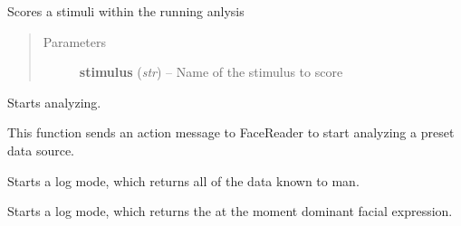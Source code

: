\documentclass[letterpaper,10pt,english]{sphinxmanual}
\begin{document}
\begin{fulllineitems}
\begin{fulllineitems}
\end{fulllineitems}


\begin{fulllineitems}
\label{_static/code:FaceReader.FaceReader.score_stimulus}
Scores a stimuli within the running anlysis
\begin{quote}\begin{description}
\item[{Parameters}] \leavevmode
\textbf{stimulus} (\emph{str}) -- Name of the stimulus to score

\end{description}\end{quote}

\end{fulllineitems}


\begin{fulllineitems}
\label{_static/code:FaceReader.FaceReader.start_analyzing}
Starts analyzing.

This function sends an action message to FaceReader to start analyzing a preset data source.

\end{fulllineitems}


\begin{fulllineitems}
\label{_static/code:FaceReader.FaceReader.start_detailed_log}
Starts a log mode, which returns all of the data known to man.

\end{fulllineitems}


\begin{fulllineitems}
\label{_static/code:FaceReader.FaceReader.start_state_log}
Starts a log mode, which returns the at the moment dominant facial expression.

\end{fulllineitems}


\end{fulllineitems}
\end{document}
